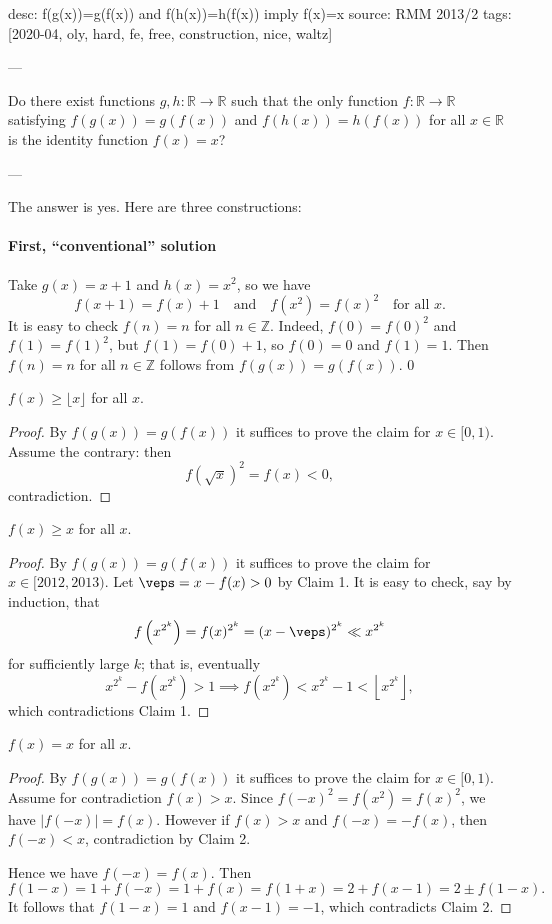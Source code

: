 desc: f(g(x))=g(f(x)) and f(h(x))=h(f(x)) imply f(x)=x
source: RMM 2013/2
tags: [2020-04, oly, hard, fe, free, construction, nice, waltz]

---

Do there exist functions $g,h:\mathbb R\to\mathbb R$ such that the only function $f:\mathbb R\to\mathbb R$ satisfying $f(g(x))=g(f(x))$ and $f(h(x))=h(f(x))$ for all $x\in\mathbb R$ is the identity function $f(x)=x$?

---

The answer is yes. Here are three constructions:

\paragraph{First, ``conventional'' solution}     Take $g(x)=x+1$ and $h(x)=x^2$, so we have \[f(x+1)=f(x)+1\quad\text{and}\quad f\left(x^2\right)=f(x)^2\quad\text{for all }x.\]
It is easy to check $f(n)=n$ for all $n\in\mathbb Z$. Indeed, $f(0)=f(0)^2$ and $f(1)=f(1)^2$, but $f(1)=f(0)+1$, so $f(0)=0$ and $f(1)=1$. Then $f(n)=n$ for all $n\in\mathbb Z$ follows from $f(g(x))=g(f(x))$.
\setcounter{claim}0
\begin{claim}
    $f(x)\ge\lfloor x\rfloor$ for all $x$.
\end{claim}
\begin{proof}
    By $f(g(x))=g(f(x))$ it suffices to prove the claim for $x\in[0,1)$. Assume the contrary: then \[f\left(\sqrt x\right)^2=f(x)<0,\]
    contradiction.
\end{proof}
\begin{claim}
    $f(x)\ge x$ for all $x$.
\end{claim}
\begin{proof}
    By $f(g(x))=g(f(x))$ it suffices to prove the claim for $x\in[2012,2013)$. Let $\veps=x-f(x)>0$ by Claim 1. It is easy to check, say by induction, that \[f\left(x^{2^k}\right)=f(x)^{2^k}=(x-\veps)^{2^k}\ll x^{2^k}\]
    for sufficiently large $k$; that is, eventually \[x^{2^k}-f\left(x^{2^k}\right)>1\implies f\left(x^{2^k}\right)<x^{2^k}-1<\left\lfloor x^{2^k}\right\rfloor,\]
    which contradictions Claim 1.
\end{proof}
\begin{claim}
    $f(x)=x$ for all $x$.
\end{claim}
\begin{proof}
    By $f(g(x))=g(f(x))$ it suffices to prove the claim for $x\in[0,1)$. Assume for contradiction $f(x)>x$. Since $f(-x)^2=f(x^2)=f(x)^2$, we have $|f(-x)|=f(x)$. However if $f(x)>x$ and $f(-x)=-f(x)$, then $f(-x)<x$, contradiction by Claim 2.

    Hence we have $f(-x)=f(x)$. Then \[f(1-x)=1+f(-x)=1+f(x)=f(1+x)=2+f(x-1)=2\pm f(1-x).\]
    It follows that $f(1-x)=1$ and $f(x-1)=-1$, which contradicts Claim 2.
\end{proof}

